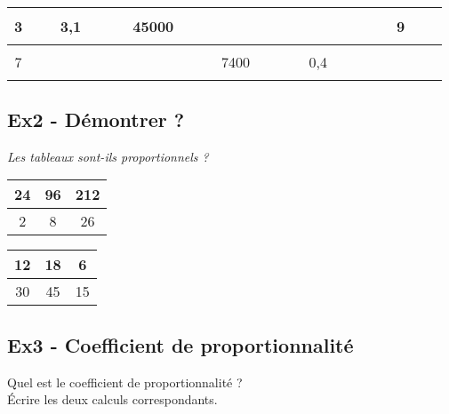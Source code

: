 \begin{center} \begin{tabular}{|c|c|c|c|c|c|} \hline
   3 &  3,1                   &                  45000 &  $\phantom{\dfrac{azertyuiop}{O}}$ & $\phantom{\dfrac{azertyuiop}{O}}$&                     9\\ \hline
   7 &  $\phantom{\dfrac{azertyuiop}{O}}$ & $\phantom{\dfrac{azertyuiop}{O}}$ &                   7400 &                    0,4 &  $\phantom{\dfrac{azertyuiop}{O}}$\\ \hline     
  \end{tabular}\end{center}

\Pointilles[5]

\subsection*{Ex2 - Démontrer ?}

\textit{Les tableaux sont-ils proportionnels ? } 

\begin{multicols}{2}\noindent
  \begin{center}\begin{tabular}{|c|c|c|} \hline
    24 & 96 & 212 \\  \hline
    2 & 8 & 26\\  \hline
  \end{tabular}\end{center}

  \Pointilles[5]  \columnbreak 

  \begin{center}\begin{tabular}{|c|c|c|} \hline
    12 & 18 & 6 \\  \hline
    30 & 45 & 15\\  \hline
  \end{tabular}\end{center}

  \Pointilles[5] 

\end{multicols}

\subsection*{Ex3 - Coefficient de proportionnalité}

Quel est le coefficient de proportionnalité ?\\
Écrire les deux calculs correspondants.


